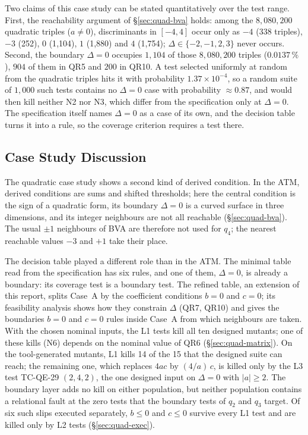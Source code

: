 \documentclass[11pt,a4paper]{article}
\begin{document}
Two claims of this case study can be stated quantitatively over the test
range. First, the reachability argument of \S\ref{sec:quad-bva} holds:
among the \(8{,}080{,}200\) quadratic triples (\(a\ne0\)), discriminants in
\([-4,4]\) occur only as \(-4\) (338 triples), \(-3\) (252), \(0\) (1{,}104),
\(1\) (1{,}880) and \(4\) (1{,}754); \(\Delta\in\{-2,-1,2,3\}\) never occurs.
Second, the boundary \(\Delta=0\) occupies \(1{,}104\) of those
\(8{,}080{,}200\) triples (\(0.0137\,\%\)), \(904\) of them in QR5 and \(200\)
in QR10. A test selected uniformly at random from the quadratic triples hits
it with probability \(1.37\times10^{-4}\), so a random suite of \(1{,}000\)
such tests contains no \(\Delta=0\) case with probability \(\approx0.87\), and
would then kill neither N2 nor N3, which differ from the specification only
at \(\Delta=0\). The specification itself names \(\Delta=0\) as a case of its
own, and the decision table turns it into a rule, so the coverage criterion
requires a test there.
\subsection{Case Study Discussion}
\label{sec:quad-discussion}

The quadratic case study shows a second kind of derived condition. In the
ATM, derived conditions are sums and shifted thresholds; here the central
condition is the sign of a quadratic form, its boundary \(\Delta=0\) is a
curved surface in three dimensions, and its integer neighbours are not all
reachable (\S\ref{sec:quad-bva}). The usual \(\pm1\) neighbours of BVA are
therefore not used for \(q_4\); the nearest reachable values \(-3\) and
\(+1\) take their place.

The decision table played a different role than in the ATM. The minimal
table read from the specification has six rules, and one of them,
\(\Delta=0\), is already a boundary: its coverage test is a boundary test.
The refined table, an extension of this report, splits Case~A by the
coefficient conditions \(b=0\) and \(c=0\); its feasibility analysis shows
how they constrain \(\Delta\) (QR7, QR10) and gives the boundaries \(b=0\) and
\(c=0\) rules inside Case~A from which neighbours are taken. With the chosen
nominal inputs, the L1 tests kill all ten designed mutants; one of these
kills (N6) depends on the nominal value of QR6 (\S\ref{sec:quad-matrix}).
On the tool-generated mutants, L1 kills 14 of the 15 that the designed suite
can reach; the remaining one, which replaces \(4ac\) by \((4/a)\,c\), is killed only
by the L3 test TC-QE-29 \((2,4,2)\), the one designed input on
\(\Delta=0\) with \(|a|\ge2\). The boundary layer adds no kill on either
population, but neither population contains a relational fault at the zero
tests that the boundary tests of \(q_2\) and \(q_3\) target. Of six such slips
executed separately, \(b\le0\) and \(c\le0\) survive every L1 test and are
killed only by L2 tests (\S\ref{sec:quad-exec}).
\end{document}
